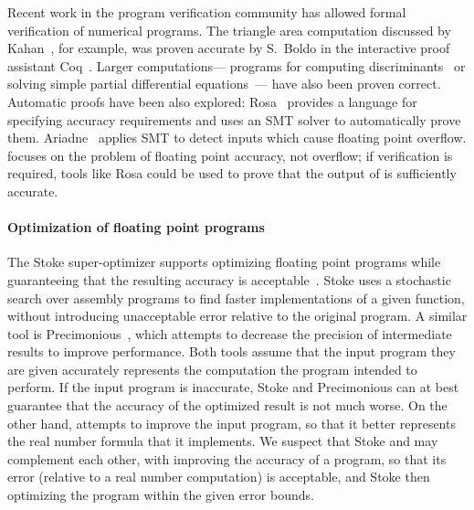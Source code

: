 \documentclass[paper.tex]{subfiles}
\begin{document}
Recent work in the program verification community
  has allowed formal verification of numerical programs.
The triangle area computation discussed by Kahan~\cite{berkeley00-needle-like},
  for example, was proven accurate by S.~Boldo
  in the interactive proof assistant Coq~\cite{arith13-area-triangle}.
Larger computations---%
  programs for computing discriminants~\cite{ieee09-discriminant-proven}
  or solving simple partial differential equations~\cite{jar13-wave-equation-prove}---%
  have also been proven correct.
Automatic proofs have been also explored:
  Rosa~\cite{popl14-rosa} provides a language for specifying accuracy requirements
  and uses an SMT solver to automatically prove them.
Ariadne~\cite{popl13-ariadne} applies SMT
  to detect inputs which cause floating point overflow.
\casio focuses on the problem of floating point accuracy, not overflow;
  if verification is required, tools like Rosa could be used
  to prove that the output of \casio is sufficiently accurate.

\paragraph{Optimization of floating point programs}
The Stoke super-optimizer supports
  optimizing floating point programs while guaranteeing
  that the resulting accuracy is acceptable~\cite{pldi14-stoke}.
Stoke uses a stochastic search over assembly programs
  to find faster implementations of a given function,
  without introducing unacceptable error
  relative to the original program.
A similar tool is Precimonious~\cite{sc13-precimonious},
  which attempts to decrease the precision of intermediate results
  to improve performance.
Both tools assume that the input program they are given
  accurately represents the computation the program intended to perform.
If the input program is inaccurate, Stoke and Precimonious can at best guarantee
  that the accuracy of the optimized result is not much worse.
On the other hand, \casio attempts to improve the input program,
  so that it better represents
  the real number formula that it implements.
We suspect that Stoke and \casio may complement each other,
  with \casio improving the accuracy of a program,
  so that its error (relative to a real number computation) is acceptable,
  and Stoke then optimizing the program within the given error bounds.
\end{document}
